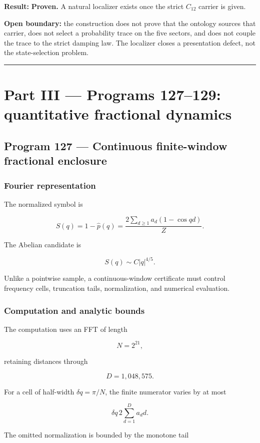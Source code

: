 \documentclass[11pt,a4paper,openany]{report}
\begin{document}
\textbf{Result:} \textbf{Proven.} A natural localizer exists once the strict \(C_{12}\) carrier is given.

\textbf{Open boundary:} the construction does not prove that the ontology sources that carrier, does not select a probability trace on the five sectors, and does not couple the trace to the strict damping law. The localizer closes a presentation defect, not the state-selection problem.

\par\medskip\hrule\medskip

\chapter{Part III --- Programs 127--129: quantitative fractional dynamics}

\section{Program 127 --- Continuous finite-window fractional enclosure}

\subsection{Fourier representation}

The normalized symbol is

\[
S(q)=1-\widehat p(q)
=
\frac{2\sum_{d\ge1}a_d(1-\cos qd)}{Z}.
\]

The Abelian candidate is

\[
S(q)\sim C|q|^{4/5}.
\]

Unlike a pointwise sample, a continuous-window certificate must control frequency cells, truncation tails, normalization, and numerical evaluation.

\subsection{Computation and analytic bounds}

The computation uses an FFT of length

\[
N=2^{21},
\]

retaining distances through

\[
D=1,048,575.
\]

For a cell of half-width \(\delta q=\pi/N\), the finite numerator varies by at most

\[
\delta q\,
2\sum_{d=1}^{D}a_d d.
\]

The omitted normalization is bounded by the monotone tail
\end{document}
